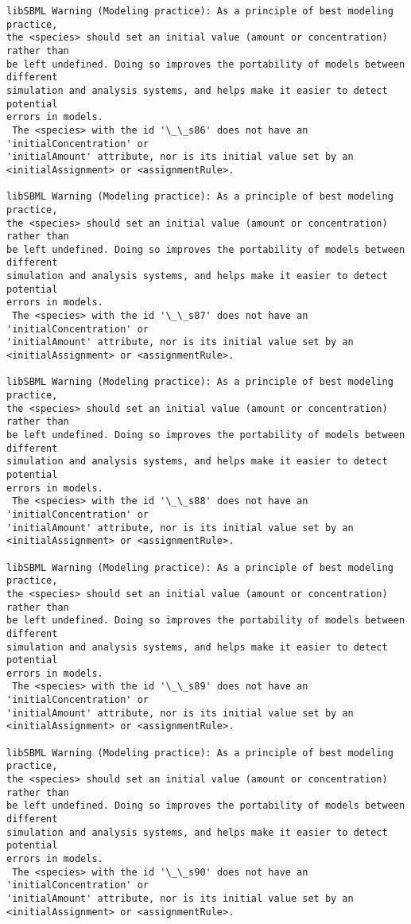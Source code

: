 \documentclass[11pt]{article}
\begin{document}
\begin{Verbatim}[commandchars=\\\{\}]
libSBML Warning (Modeling practice): As a principle of best modeling practice,
the <species> should set an initial value (amount or concentration) rather than
be left undefined. Doing so improves the portability of models between different
simulation and analysis systems, and helps make it easier to detect potential
errors in models.
 The <species> with the id '\_\_s86' does not have an 'initialConcentration' or
'initialAmount' attribute, nor is its initial value set by an
<initialAssignment> or <assignmentRule>.

libSBML Warning (Modeling practice): As a principle of best modeling practice,
the <species> should set an initial value (amount or concentration) rather than
be left undefined. Doing so improves the portability of models between different
simulation and analysis systems, and helps make it easier to detect potential
errors in models.
 The <species> with the id '\_\_s87' does not have an 'initialConcentration' or
'initialAmount' attribute, nor is its initial value set by an
<initialAssignment> or <assignmentRule>.

libSBML Warning (Modeling practice): As a principle of best modeling practice,
the <species> should set an initial value (amount or concentration) rather than
be left undefined. Doing so improves the portability of models between different
simulation and analysis systems, and helps make it easier to detect potential
errors in models.
 The <species> with the id '\_\_s88' does not have an 'initialConcentration' or
'initialAmount' attribute, nor is its initial value set by an
<initialAssignment> or <assignmentRule>.

libSBML Warning (Modeling practice): As a principle of best modeling practice,
the <species> should set an initial value (amount or concentration) rather than
be left undefined. Doing so improves the portability of models between different
simulation and analysis systems, and helps make it easier to detect potential
errors in models.
 The <species> with the id '\_\_s89' does not have an 'initialConcentration' or
'initialAmount' attribute, nor is its initial value set by an
<initialAssignment> or <assignmentRule>.

libSBML Warning (Modeling practice): As a principle of best modeling practice,
the <species> should set an initial value (amount or concentration) rather than
be left undefined. Doing so improves the portability of models between different
simulation and analysis systems, and helps make it easier to detect potential
errors in models.
 The <species> with the id '\_\_s90' does not have an 'initialConcentration' or
'initialAmount' attribute, nor is its initial value set by an
<initialAssignment> or <assignmentRule>.


\end{Verbatim}
\end{document}
